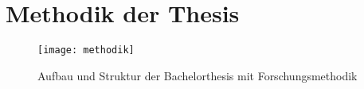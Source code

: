 
\section{Methodik der Thesis}

\begin{figure}[H]
    \centering
    \texttt{[image: methodik]}
    \captionsetup{font=scriptsize}
    \caption{Aufbau und Struktur der Bachelorthesis mit Forschungsmethodik}
    \label{fig:methodik}
\end{figure}
\clearpage